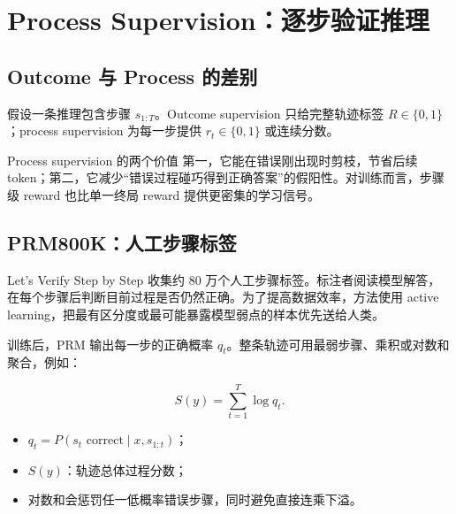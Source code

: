 \section{Process Supervision：逐步验证推理}

\subsection{Outcome 与 Process 的差别}

假设一条推理包含步骤 $s_{1:T}$。Outcome supervision 只给完整轨迹标签 $R\in\{0,1\}$；process supervision 为每一步提供 $r_t\in\{0,1\}$ 或连续分数。



\begin{importantbox}{Process supervision 的两个价值}
第一，它能在错误刚出现时剪枝，节省后续 token；第二，它减少“错误过程碰巧得到正确答案”的假阳性。对训练而言，步骤级 reward 也比单一终局 reward 提供更密集的学习信号。
\end{importantbox}

\subsection{PRM800K：人工步骤标签}

Let's Verify Step by Step 收集约 80 万个人工步骤标签。标注者阅读模型解答，在每个步骤后判断目前过程是否仍然正确。为了提高数据效率，方法使用 active learning，把最有区分度或最可能暴露模型弱点的样本优先送给人类。


训练后，PRM 输出每一步的正确概率 $q_t$。整条轨迹可用最弱步骤、乘积或对数和聚合，例如：

$$
S(y)=\sum_{t=1}^{T}\log q_t.
$$

\begin{itemize}
    \item $q_t=P(s_t\text{ correct}\mid x,s_{1:t})$；
    \item $S(y)$：轨迹总体过程分数；
    \item 对数和会惩罚任一低概率错误步骤，同时避免直接连乘下溢。
\end{itemize}

